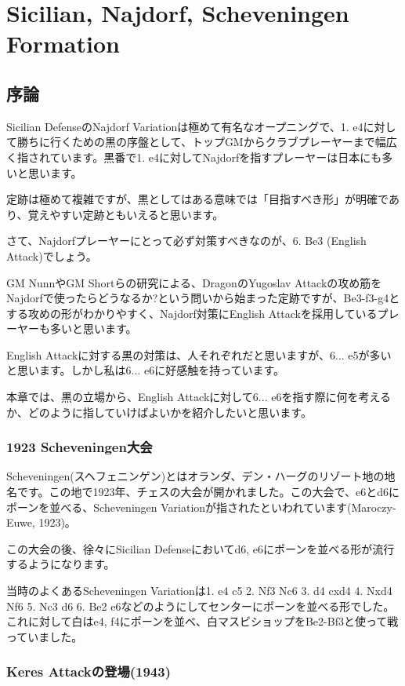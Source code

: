 \section{Sicilian, Najdorf, Scheveningen Formation}
\subsection{序論}
Sicilian DefenseのNajdorf Variationは極めて有名なオープニングで、1. e4に対して勝ちに行くための黒の序盤として、トップGMからクラブプレーヤーまで幅広く指されています。黒番で1. e4に対してNajdorfを指すプレーヤーは日本にも多いと思います。

定跡は極めて複雑ですが、黒としてはある意味では「目指すべき形」が明確であり、覚えやすい定跡ともいえると思います。

さて、Najdorfプレーヤーにとって必ず対策すべきなのが、6. Be3 (English Attack)でしょう。

GM NunnやGM Shortらの研究による、DragonのYugoslav Attackの攻め筋をNajdorfで使ったらどうなるか?という問いから始まった定跡ですが、Be3-f3-g4とする攻めの形がわかりやすく、Najdorf対策にEnglish Attackを採用しているプレーヤーも多いと思います。

English Attackに対する黒の対策は、人それぞれだと思いますが、6... e5が多いと思います。しかし私は6... e6に好感触を持っています。

本章では、黒の立場から、English Attackに対して6... e6を指す際に何を考えるか、どのように指していけばよいかを紹介したいと思います。


\subsubsection{1923 Scheveningen大会}

Scheveningen(スヘフェニンゲン)とはオランダ、デン・ハーグのリゾート地の地名です。この地で1923年、チェスの大会が開かれました。この大会で、e6とd6にポーンを並べる、Scheveningen Variationが指されたといわれています(Maroczy-Euwe, 1923)。

この大会の後、徐々にSicilian Defenseにおいてd6, e6にポーンを並べる形が流行するようになります。

当時のよくあるScheveningen Variationは1. e4 c5 2. Nf3 Nc6 3. d4 cxd4 4. Nxd4 Nf6 5. Nc3 d6 6. Be2 e6などのようにしてセンターにポーンを並べる形でした。これに対して白はe4, f4にポーンを並べ、白マスビショップをBe2-Bf3と使って戦っていました。

\subsubsection{Keres Attackの登場(1943)}

